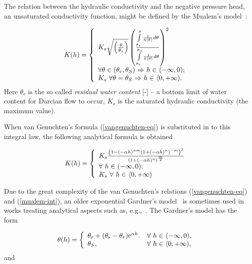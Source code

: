 \documentclass[final,3p,times,twocolumn]{elsarticle}
\begin{document}
The relation between the hydraulic conductivity and the negative pressure head, an 
unsaturated conductivity function, might be defined by the Mualem's model~\cite{mualem}:

  \begin{equation}
  \label{mualem-int}
  K(h) = \left\{
    \begin{array}{l l}
     K_s \sqrt{ \left( \frac{\theta}{\theta_s} \right)} \left( \frac{\int\limits_{\theta_r}^{\theta} \frac{1}{h(\theta)}d \theta }{\int\limits_{\theta_r}^{\theta_S} \frac{1}{h(\theta)} d \theta} \right)^2  \\
    \mbox{$\forall \theta \in (\theta_r, \theta_S )$ $\Rightarrow$ $h \in$ $(-\infty,0)$}; \\
    K_s \ \mbox{$\forall \theta= \theta_S $  $\Rightarrow$  $h \in$ $\langle 0, +\infty)$}.\\
    \end{array} \right.
    \end{equation}
Here $\theta_r$ is the so called {\em residual water content} [-] -- a bottom 
limit of water content for Darcian flow to occur, $K_s$ is the saturated 
hydraulic conductivity (the maximum value).


When van Genuchten's formula (\ref{vangenuchten-eq}) is substituted in to this integral 
law, the following analytical formula is obtained

  \begin{equation}
  \label{mualem-anal}
  K(h) = \left\{
    \begin{array}{l l}
    K_s \frac{\left( 1- (-\alpha h)^{nm} \left( 1+ (-\alpha h)^n \right)^{-m} \right)^2}{\left(1+(-\alpha h)^n \right)^{\frac{m}{2}}} \\
    \mbox{$\forall$ $h \in$ $(-\infty,0)$};\\
    K_s  \ \mbox{$\forall$ $h \in$ $\langle 0, +\infty)$}\\
    \end{array} \right.
    \end{equation}

Due to the great complexity of the van Genuchten's relations (\ref{vangenuchten-eq}) 
and (\ref{mualem-int}), an older exponential Gardner's model~\cite{gardner} 
is sometimes used in works treating analytical aspects such as, e.g.,~\cite{tracy1,tracy2}. 
The Gardner's model has the form

\begin{equation}
\label{gardner-theta}
\theta (h) = \left\{ 
\begin{array}{l l}
 \theta_r + (\theta_s -\theta_r)\textrm{e}^{\alpha h}. & \mbox{$\forall$  $h \in$ $(-\infty,0)$},\\
  \theta_S, & \mbox{$\forall$ $h \in \langle 0, + \infty )$},
\end{array} \right.
\end{equation}
and 
\end{document}
